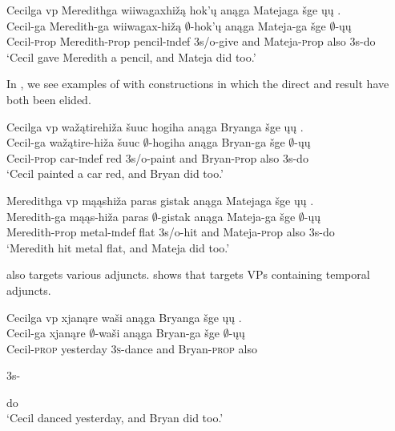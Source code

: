\documentclass[output=paper]{LSP/langsci}
\begin{document}
 
\ea\label{ex:johnson:5} 
\glll Cecilga {\ob}{vp} Meredithga wiiwagaxhižą hok'ų{\cb} anąga Matejaga šge {\ob}ųų{\cb} .\\
Cecil-ga {} Meredith-ga wiiwagax-hižą $\emptyset$-hok'ų anąga Mateja-ga šge $\emptyset$-ųų\\
Cecil-{\textsc prop} {} Meredith-{\textsc prop} pencil-{\textsc indef} {\textsc 3s/o}-give and Mateja-{\textsc prop} also {\textsc 3s}-do\\
\trans `Cecil gave Meredith a pencil, and Mateja did too.'
\z

In , we see examples of  with  constructions in which the direct  and result have both been elided. 
 
\ea\label{ex:johnson:6}
\ea\label{ex:johnson:6a} 
\glll Cecilga  {\ob}{vp} wažątirehiža šuuc hogiha{\cb} anąga Bryanga šge {\ob}ųų{\cb} .\\
Cecil-ga {} wažątire-hiža šuuc $\emptyset$-hogiha anąga Bryan-ga šge $\emptyset$-ųų\\
Cecil-{\textsc prop} {} car-{\textsc indef} red {\textsc 3s/o}-paint and Bryan-{\textsc prop} also {\textsc 3s}-do\\
\trans `Cecil painted a car red, and Bryan did too.'
 
\ex\label{ex:johnson:6b} 
\glll Meredithga  {\ob}{vp} mąąshiža paras gistak{\cb} anąga Matejaga šge {\ob}ųų{\cb} .\\
Meredith-ga {} mąąs-hiža paras $\emptyset$-gistak anąga Mateja-ga šge $\emptyset$-ųų\\
Meredith-{\textsc prop} {} metal-{\textsc indef} flat {\textsc 3s/o}-hit and Mateja-{\textsc prop} also {\textsc 3s}-do\\
\trans `Meredith hit metal flat, and Mateja did too.'
\z
\z

 also targets various adjuncts.  shows that  targets VPs containing temporal adjuncts. 
 
\ea\label{ex:johnson:7}
\ea 
\glll Cecilga {\ob}{vp} xjanąre waši{\cb} anąga Bryanga šge {\ob}ųų{\cb} .\\
Cecil-ga {} xjanąre $\emptyset$-waši anąga Bryan-ga šge $\emptyset$-ųų\\
Cecil-\textsc{prop} {} yesterday \textsc{3s}-dance and Bryan-\textsc{prop} also \begin{sc}3s-\end{sc}do\\
\trans `Cecil danced yesterday, and Bryan did too.'
\end{document}

